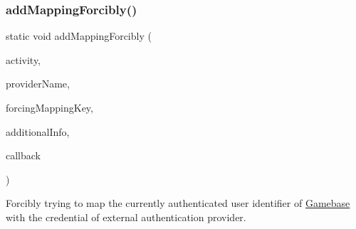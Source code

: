 \mbox{\label{classcom_1_1toast_1_1android_1_1gamebase_1_1_gamebase_af9f8a372c5b76389cde5f7552a041ee6}} 
\subsubsection{\texorpdfstring{add\+Mapping\+Forcibly()}{addMappingForcibly()}\hspace{0.1cm}{\footnotesize\ttfamily [2/3]}}
{\footnotesize\ttfamily static void add\+Mapping\+Forcibly (\begin{DoxyParamCaption}\item[{@Non\+Null final Activity}]{activity,  }\item[{@Non\+Null final String}]{provider\+Name,  }\item[{@Non\+Null final String}]{forcing\+Mapping\+Key,  }\item[{@Nullable final Map$<$ String, Object $>$}]{additional\+Info,  }\item[{@Nullable final \hyperlink{interfacecom_1_1toast_1_1android_1_1gamebase_1_1_gamebase_data_callback}{Gamebase\+Data\+Callback}$<$ \hyperlink{classcom_1_1toast_1_1android_1_1gamebase_1_1auth_1_1data_1_1_auth_token}{Auth\+Token} $>$}]{callback }\end{DoxyParamCaption})\hspace{0.3cm}{\ttfamily [static]}}



Forcibly trying to map the currently authenticated user identifier of \hyperlink{classcom_1_1toast_1_1android_1_1gamebase_1_1_gamebase}{Gamebase} with the credential of external authentication provider. 


